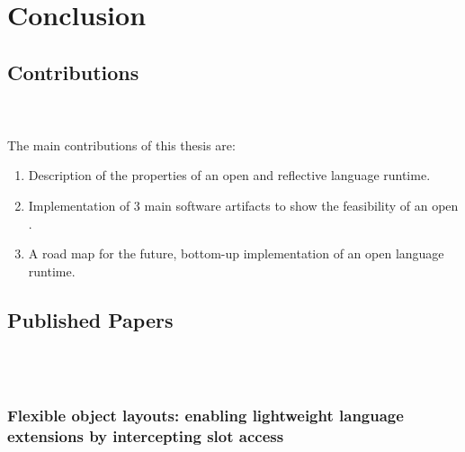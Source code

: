 
\chapter{Conclusion}
\minitoc

\section{Contributions}
 \\
 \\
The main contributions of this thesis are:
\begin{enumerate}
	\item Description of the properties of an open and reflective language runtime.
	\item Implementation of 3 main software artifacts to show the feasibility of an open \VM.
	\item A road map for the future, bottom-up implementation of an open language runtime.
\end{enumerate}


\section{Published Papers}
 \\
 \\
\subsection{Flexible object layouts: enabling lightweight language extensions by intercepting slot access}

